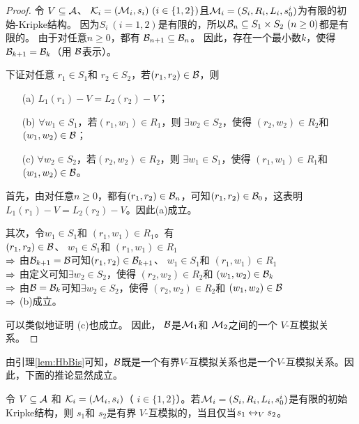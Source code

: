 \begin{proof}
	令 $V \subseteq {\cal A}$、 ${\cal K}_i=({\cal M}_i,s_i)~(i\in\{1,2\})$且${\cal M}_i=(S_i, R_i,L_i, s_0^i)$为有限的初始-Kripke结构。
	因为$S_i~(i=1,2)$是有限的，所以${\cal B}_n\subseteq S_1\times S_2~(n\ge 0)$都是有限的。
	由于对任意$n\geq 0$，都有 ${\cal B}_{n+1} \subseteq {\cal B}_n$。
	因此，存在一个最小数$k$，使得
	${\cal B}_{k+1} ={\cal B}_k$（用 ${\cal B}$表示）。
	
	
	下证对任意 $r_1\in S_1$和 $r_2 \in S_2$，若$(r_1, r_2)\in {\cal B}$，则 %
	\begin{itemize}
		\item[(a)] $L_1(r_1)-V = L_2(r_2)-V$；
		\item[(b)] $\forall w_1\in S_1$，若$(r_1, w_1)\in R_1$，则 $\exists w_2 \in S_2$，使得 $(r_2,w_2) \in R_2$和 $(w_1, w_2) \in {\cal B}$；
		\item[(c)] $\forall w_2\in S_2$，若$(r_2, w_2)\in R_2$，则 $\exists w_1 \in S_1$，使得 $(r_1,w_1) \in R_1$和 $(w_1, w_2)\in {\cal B} $。
	\end{itemize}
	
	首先，由对任意$n\ge 0$，都有$(r_1, r_2)\in {\cal B}_n$，可知$(r_1, r_2) \in {\cal B}_0$，这表明
	$L_1(r_1)-V = L_2(r_2)-V$。因此(a)成立。
	
	其次，令$w_1 \in S_1$和 $(r_1, w_1)\in R_1$。有 \\
	$(r_1,r_2)\in {\cal B}$、 $w_1 \in S_1$和 $(r_1, w_1)\in R_1$\\
	$\Rightarrow$ 由${\cal B}_{k+1}={\cal B}$可知$(r_1,r_2)\in {\cal B}_{k+1}$、 $w_1 \in S_1$和 $(r_1, w_1)\in R_1$\\
	$\Rightarrow$ 由定义可知$\exists w_2\in S_2$，使得 $(r_2, w_2)\in R_2$和 $(w_1,w_2)\in {\cal B}_k$\\
	$\Rightarrow$ 由${\cal B}={\cal B}_k$可知$\exists w_2\in S_2$，使得 $(r_2, w_2)\in R_2$和 $(w_1,w_2)\in {\cal B}$\\
	$\Rightarrow$ (b)成立。
	
	可以类似地证明 (c)也成立。
	因此， ${\cal B}$是${\cal M}_1$和 ${\cal M}_2$之间的一个 $V$-互模拟关系。
\end{proof}

由引理\ref{lem:HbBis}可知，${\cal B}$既是一个有界$V$-互模拟关系也是一个$V$-互模拟关系。因此，下面的推论显然成立。
\begin{corollary} \label{lem:bounedToGe}
	令 $V \subseteq {\cal A}$ 和 ${\cal K}_i=({\cal M}_i,s_i)$（ $i\in\{1,2\}$）。若${\cal M}_i=(S_i, R_i,L_i, s_0^i)$是有限的初始Kripke结构，则
	$s_1$和 $s_2$是有界 $V$-互模拟的，当且仅当$s_1 \leftrightarrow_V s_2$。
\end{corollary}


